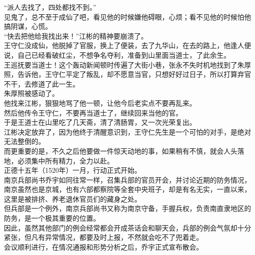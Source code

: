 \begin{multicols}{\theparacolNo}
“派人去找了，四处都找不到。”\\

见鬼了，总不至于成仙了吧，看见他的时候嫌他碍眼，心烦；看不见他的时候怕他搞阴谋，心慌。\\

“快去把他给我找出来！”江彬的精神要崩溃了。\\

王守仁没成仙，他脱掉了官服，换上了便装，去了九华山，在去的路上，他逢人便说，自己已经看破红尘，不想争名夺利，准备到山里面当道士，了此余生。\\

王巡抚要当道士！这个轰动新闻顿时传遍了大街小巷，张永不失时机地找到了朱厚照，告诉他，王守仁平定了叛乱，却不愿意当官，只想好好过日子，所以打算弃官不干，去修道了此一生。\\

朱厚照被感动了。\\

他找来江彬，狠狠地骂了他一顿，让他今后老实点不要再乱来。\\

然后他传令王守仁，不要再当道士了，继续回来当他的官。\\

于是王道士在山里吃了几天斋，清了清肠胃，又一次光荣复出。\\

江彬决定放弃了，因为他终于清醒意识到，王守仁先生是一个可怕的对手，是绝对无法整倒的。\\

而更重要的是，不久之后他要做一件惊天动地的事，如果稍有不慎，就会人头落地，必须集中所有精力，全力以赴。\\

正德十五年（1520年）一月，行动正式开始。\\

南京兵部尚书乔宇如同往常一样，召集兵部的官员开会，并讨论近期的防务情况，南京虽然也是京城，也有六部都察院等全套中央班子，却是有名无实，一直以来，这里是被排挤、养老退休官员们的藏身之处。\\

但兵部是一个例外，南京兵部尚书又称为南京守备，手握兵权，负责南直隶地区的防务，是一个极其重要的位置。\\

因此，虽然其他部门的例会经常都会开成茶话会和聊天会，兵部的例会气氛却十分紧张，但凡有异常情况，都要及时上报，不然就会吃不了兜着走。\\

会议顺利进行，在情况通报和形势分析之后，乔宇正式宣布散会。\\


\end{multicols}
